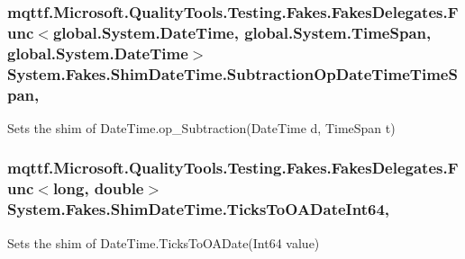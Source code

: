 \hypertarget{class_system_1_1_fakes_1_1_shim_date_time_a2e0ddf7d1af519438116c997ef18a61b}{
\subsubsection[{Subtraction\-Op\-Date\-Time\-Time\-Span}]{\setlength{\rightskip}{0pt plus 5cm}mqttf.\-Microsoft.\-Quality\-Tools.\-Testing.\-Fakes.\-Fakes\-Delegates.\-Func$<$global.\-System.\-Date\-Time, global.\-System.\-Time\-Span, global.\-System.\-Date\-Time$>$ System.\-Fakes.\-Shim\-Date\-Time.\-Subtraction\-Op\-Date\-Time\-Time\-Span\hspace{0.3cm}{\ttfamily [static]}, {\ttfamily [set]}}}\label{class_system_1_1_fakes_1_1_shim_date_time_a2e0ddf7d1af519438116c997ef18a61b}


Sets the shim of Date\-Time.\-op\-\_\-\-Subtraction(\-Date\-Time d, Time\-Span t)

\hypertarget{class_system_1_1_fakes_1_1_shim_date_time_acadbe56a84f762958aa29ebeff6748c8}{
\subsubsection[{Ticks\-To\-O\-A\-Date\-Int64}]{\setlength{\rightskip}{0pt plus 5cm}mqttf.\-Microsoft.\-Quality\-Tools.\-Testing.\-Fakes.\-Fakes\-Delegates.\-Func$<$long, double$>$ System.\-Fakes.\-Shim\-Date\-Time.\-Ticks\-To\-O\-A\-Date\-Int64\hspace{0.3cm}{\ttfamily [static]}, {\ttfamily [set]}}}\label{class_system_1_1_fakes_1_1_shim_date_time_acadbe56a84f762958aa29ebeff6748c8}


Sets the shim of Date\-Time.\-Ticks\-To\-O\-A\-Date(\-Int64 value)

